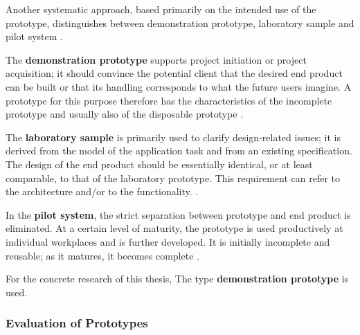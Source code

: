 Another systematic approach, based primarily on the intended use of the prototype, distinguishes between demonstration prototype, laboratory sample and pilot system
\autocite{riedlManagementInformatik2019}.

The \textbf{demonstration prototype} supports project initiation or project acquisition; it should convince the potential client that the desired end product can be built or that its handling corresponds to what the future users imagine. A prototype for this purpose therefore has the characteristics of the incomplete prototype and usually also of the disposable prototype
\autocite{riedlManagementInformatik2019}.

The \textbf{laboratory sample} is primarily used to clarify design-related issues; it is derived from the model of the application task and from an existing specification. The design of the end product should be essentially identical, or at least comparable, to that of the laboratory prototype. This requirement can refer to the architecture and/or to the functionality.
\autocite{riedlManagementInformatik2019}.

In the \textbf{pilot system}, the strict separation between prototype and end product is eliminated. At a certain level of maturity, the prototype is used productively at individual workplaces and is further developed. It is initially incomplete and reusable; as it matures, it becomes complete
\autocite{riedlManagementInformatik2019}.

%

For the concrete research of this thesis,
The type \textbf{demonstration prototype} is used.

\subsubsection*{Evaluation of Prototypes}

